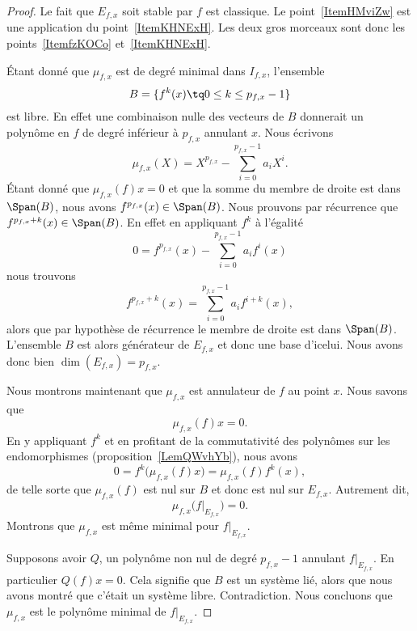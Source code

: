 \begin{proof}
	Le fait que \( E_{f,x}\) soit stable par \( f\) est classique. Le point~\ref{ItemHMviZw} est une application du point~\ref{ItemKHNExH}. Les deux gros morceaux sont donc les points~\ref{ItemfzKOCo} et~\ref{ItemKHNExH}.

	Étant donné que \( \mu_{f,x}\) est de degré minimal dans \( I_{f,x}\), l'ensemble
	\begin{equation}
		B=\{ f^k(x)\tq 0\leq k\leq p_{f,x}-1 \}
	\end{equation}
	est libre. En effet une combinaison nulle des vecteurs de \( B\) donnerait un polynôme en \( f\) de degré inférieur à \( p_{f,x}\) annulant \( x\). Nous écrivons
	\begin{equation}
		\mu_{f,x}(X)=X^{p_{f,x}}-\sum_{i=0}^{p_{f,x}-1}a_iX^i.
	\end{equation}
	Étant donné que \( \mu_{f,x}(f)x=0\) et que la somme du membre de droite est dans \( \Span(B)\), nous avons \( f^{p_{f,x}}(x)\in\Span(B)\). Nous prouvons par récurrence que \( f^{p_{f,x}+k}(x)\in\Span(B)\). En effet en appliquant \( f^k\) à l'égalité
	\begin{equation}
		0=f^{p_{f,x}}(x)-\sum_{i=0}^{p_{f,x}-1}a_if^i(x)
	\end{equation}
	nous trouvons
	\begin{equation}
		f^{p_{f,x}+k}(x)=\sum_{i=0}^{p_{f,x}-1}a_if^{i+k}(x),
	\end{equation}
	alors que par hypothèse de récurrence le membre de droite est dans \( \Span(B)\). L'ensemble \( B\) est alors générateur de \( E_{f,x}\) et donc une base d'icelui. Nous avons donc bien \( \dim(E_{f,x})=p_{f,x}\).

	Nous montrons maintenant que \( \mu_{f,x}\) est annulateur de \( f\) au point \( x\). Nous savons que
	\begin{equation}
		\mu_{f,x}(f)x=0.
	\end{equation}
	En y appliquant \( f^k\) et en profitant de la commutativité des polynômes sur les endomorphismes (proposition~\ref{LemQWvhYb}), nous avons
	\begin{equation}
		0=f^k\big( \mu_{f,x}(f)x \big)=\mu_{f,x}(f)f^k(x),
	\end{equation}
	de telle sorte que \( \mu_{f,x}(f)\) est nul sur \( B\) et donc est nul sur \( E_{f,x}\). Autrement dit,
	\begin{equation}
		\mu_{f,x}\big( f|_{E_{f,x}} \big)=0.
	\end{equation}
	Montrons que \( \mu_{f,x}\) est même minimal pour \( f|_{E_{f,x}}\).

	Supposons avoir \( Q\), un polynôme non nul de degré \( p_{f,x}-1\) annulant \( f|_{E_{f,x}}\). En particulier \( Q(f)x=0\). Cela signifie que \( B\) est un système lié, alors que nous avons montré que c'était un système libre. Contradiction. Nous concluons que \( \mu_{f,x}\) est le polynôme minimal de \( f|_{E_{f,x}}\).
\end{proof}

